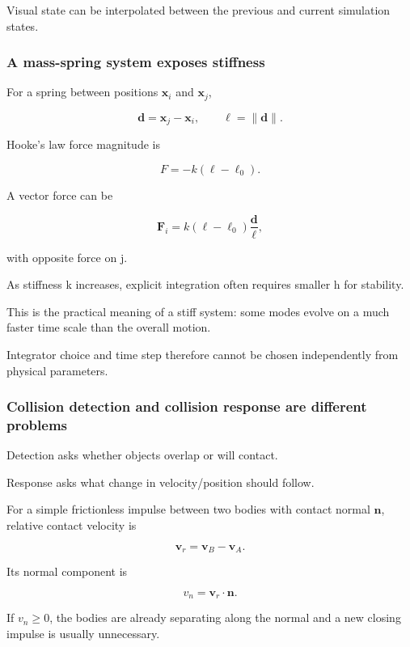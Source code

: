 Visual state can be interpolated between the previous and current simulation states.

\subsubsection{A mass-spring system exposes stiffness}\label{03-visual-computing-i-ch001-a-mass-spring-system-exposes-stiffness}

For a spring between positions \(\mathbf x_i\) and \(\mathbf x_j\),

\[
\mathbf d=\mathbf x_j-\mathbf x_i,
\qquad
\ell=\|\mathbf d\|.
\]

Hooke's law force magnitude is

\[
F=-k(\ell-\ell_0).
\]

A vector force can be

\[
\mathbf F_i
=
k(\ell-\ell_0)
\frac{\mathbf d}{\ell},
\]

with opposite force on j.

As stiffness k increases, explicit integration often requires smaller h for stability.

This is the practical meaning of a stiff system: some modes evolve on a much faster time scale than the overall motion.

Integrator choice and time step therefore cannot be chosen independently from physical parameters.

\subsubsection{Collision detection and collision response are different problems}\label{03-visual-computing-i-ch001-collision-detection-and-collision-response-are-different-problems}

Detection asks whether objects overlap or will contact.

Response asks what change in velocity/position should follow.

For a simple frictionless impulse between two bodies with contact normal \(\mathbf n\), relative contact velocity is

\[
\mathbf v_r
=
\mathbf v_B-\mathbf v_A.
\]

Its normal component is

\[
v_n=\mathbf v_r\cdot\mathbf n.
\]

If \(v_n\ge0\), the bodies are already separating along the normal and a new closing impulse is usually unnecessary.


